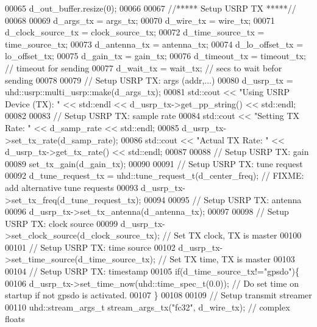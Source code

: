 \begin{DoxyCode}
00065         d_out_buffer.resize(0);
00066 
00067         \textcolor{comment}{//***** Setup USRP TX *****//}
00068 
00069         d_args_tx = args\_tx;
00070         d_wire_tx = wire\_tx;
00071         d_clock_source_tx = clock\_source\_tx;
00072         d_time_source_tx = time\_source\_tx;
00073         d_antenna_tx = antenna\_tx;
00074         d_lo_offset_tx = lo\_offset\_tx;
00075         d_gain_tx = gain\_tx;
00076         d_timeout_tx = timeout\_tx; \textcolor{comment}{// timeout for sending}
00077         d_wait_tx = wait\_tx; \textcolor{comment}{// secs to wait befor sending}
00078 
00079         \textcolor{comment}{// Setup USRP TX: args (addr,...)}
00080         d_usrp_tx = uhd::usrp::multi\_usrp::make(d_args_tx);
00081         std::cout << \textcolor{stringliteral}{"Using USRP Device (TX): "} << std::endl << d_usrp_tx->get\_pp\_string() << std::endl;
00082 
00083         \textcolor{comment}{// Setup USRP TX: sample rate}
00084         std::cout << \textcolor{stringliteral}{"Setting TX Rate: "} << d_samp_rate << std::endl;
00085         d_usrp_tx->set\_tx\_rate(d_samp_rate);
00086         std::cout << \textcolor{stringliteral}{"Actual TX Rate: "} << d_usrp_tx->get\_tx\_rate() << std::endl;
00087 
00088         \textcolor{comment}{// Setup USRP TX: gain}
00089         set_tx_gain(d_gain_tx);
00090 
00091         \textcolor{comment}{// Setup USRP TX: tune request}
00092         d_tune_request_tx = uhd::tune\_request\_t(d_center_freq); \textcolor{comment}{// FIXME: add alternative tune requests}
00093         d_usrp_tx->set\_tx\_freq(d_tune_request_tx);
00094 
00095         \textcolor{comment}{// Setup USRP TX: antenna}
00096         d_usrp_tx->set\_tx\_antenna(d_antenna_tx);
00097 
00098         \textcolor{comment}{// Setup USRP TX: clock source}
00099         d_usrp_tx->set\_clock\_source(d_clock_source_tx); \textcolor{comment}{// Set TX clock, TX is master}
00100 
00101         \textcolor{comment}{// Setup USRP TX: time source}
00102         d_usrp_tx->set\_time\_source(d_time_source_tx); \textcolor{comment}{// Set TX time, TX is master}
00103 
00104         \textcolor{comment}{// Setup USRP TX: timestamp}
00105         \textcolor{keywordflow}{if}(d_time_source_tx!=\textcolor{stringliteral}{"gpsdo"})\{
00106             d_usrp_tx->set\_time\_now(uhd::time\_spec\_t(0.0)); \textcolor{comment}{// Do set time on startup if not gpsdo is
       activated.}
00107         \}
00108 
00109         \textcolor{comment}{// Setup transmit streamer}
00110         uhd::stream\_args\_t stream\_args\_tx(\textcolor{stringliteral}{"fc32"}, d_wire_tx); \textcolor{comment}{// complex floats}

\end{DoxyCode}
